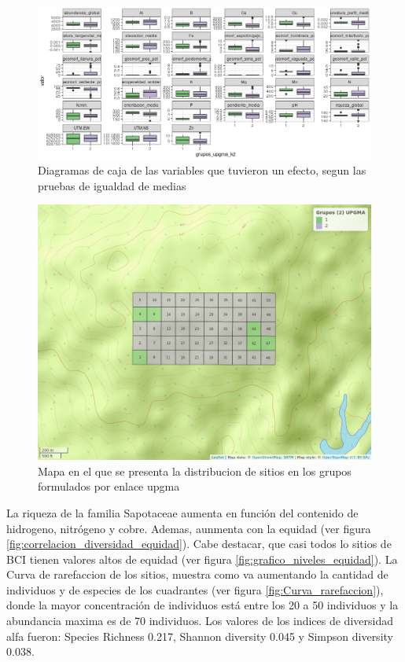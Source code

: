 \documentclass[11pt,]{article}
\begin{document}
\begin{figure}
\centering
\includegraphics[width=1.00000\textwidth]{actualizacion2_grupos_upgma.png}
\caption{Diagramas de caja de las variables que tuvieron un efecto,
segun las pruebas de igualdad de medias\label{fig:grupos_upgma}}
\end{figure}

\begin{figure}
\centering
\includegraphics{mapa_upgma_k2.png}
\caption{Mapa en el que se presenta la distribucion de sitios en los
grupos formulados por enlace upgma\label{fig:mapa_upgma_k2}}
\end{figure}

La riqueza de la familia Sapotaceae aumenta en función del contenido de
hidrogeno, nitrógeno y cobre. Ademas, aunmenta con la equidad (ver
figura \ref{fig:correlacion_diversidad_equidad}). Cabe destacar, que
casi todos lo sitios de BCI tienen valores altos de equidad (ver figura
\ref{fig:grafico_niveles_equidad}). La Curva de rarefaccion de los
sitios, muestra como va aumentando la cantidad de individuos y de
especies de los cuadrantes (ver figura \ref{fig:Curva_rarefaccion}),
donde la mayor concentración de individuos está entre los 20 a 50
individuos y la abundancia maxima es de 70 individuos. Los valores de
los indices de diversidad alfa fueron: Species Richness 0.217, Shannon
diversity 0.045 y Simpson diversity 0.038.
\end{document}

